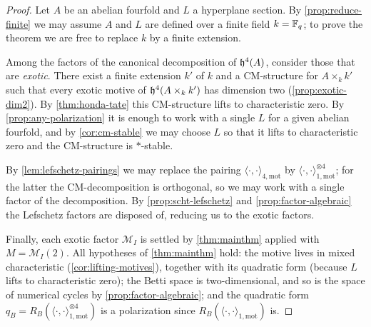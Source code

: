 \begin{proof}
  Let \(A\) be an abelian fourfold and \(L\) a hyperplane section. By
  \cref{prop:reduce-finite} we may assume \(A\) and \(L\) are defined over a
  finite field \(k = \mathbb{F}_q\); to prove the theorem we are free to replace \(k\) by
  a finite extension.

  Among the factors of the canonical decomposition of \(\mathfrak{h}^4(A)\), consider
  those that are \emph{exotic}. There exist a finite extension \(k'\) of \(k\)
  and a CM-structure for \(A \times_k k'\) such that every exotic motive of
  \(\mathfrak{h}^{4}(A \times_k k')\) has dimension two (\cref{prop:exotic-dim2}). By
  \cref{thm:honda-tate} this CM-structure lifts to characteristic zero. By
  \cref{prop:any-polarization} it is enough to work with a single \(L\) for a
  given abelian fourfold, and by \cref{cor:cm-stable} we may choose \(L\) so that
  it lifts to characteristic zero and the CM-structure is \(*\)-stable.

  By \cref{lem:lefschetz-pairings} we may replace the pairing
  \(\langle \cdot, \cdot \rangle_{4,\mathrm{mot}}\) by
  \(\langle \cdot, \cdot \rangle_{1,\mathrm{mot}}^{\otimes 4}\); for the latter
  the CM-decomposition is orthogonal, so we may work with a single factor of the
  decomposition. By \cref{prop:scht-lefschetz} and \cref{prop:factor-algebraic}
  the Lefschetz factors are disposed of, reducing us to the exotic factors.

  Finally, each exotic factor \(\mathcal{M}_I\) is settled by
  \cref{thm:mainthm} applied with \(M = \mathcal{M}_I(2)\). All hypotheses of
  \cref{thm:mainthm} hold: the motive lives in mixed characteristic
  (\cref{cor:lifting-motives}), together with its quadratic form (because \(L\)
  lifts to characteristic zero); the Betti space is two-dimensional, and so is the
  space of numerical cycles by \cref{prop:factor-algebraic}; and the quadratic
  form \(q_B = R_B(\langle \cdot, \cdot \rangle_{1,\mathrm{mot}}^{\otimes 4})\) is
  a polarization since \(R_B(\langle \cdot, \cdot \rangle_{1,\mathrm{mot}})\) is.
\end{proof}
